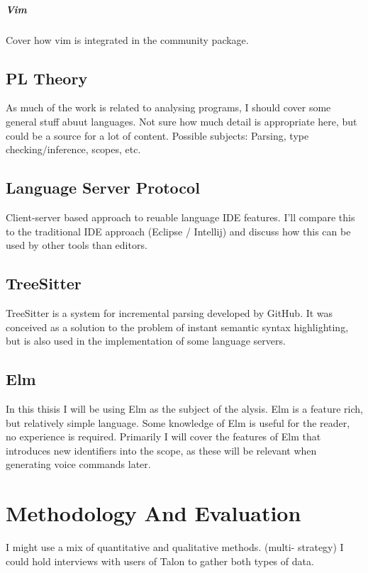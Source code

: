 \documentclass[a4paper,english]{ifimaster}
\begin{document}
\paragraph{Vim}
Cover how vim is integrated in the community package.

\section{PL Theory}
As much of the work is related to analysing programs, I should cover some general stuff abuut languages.
Not sure how much detail is appropriate here, but could be a source for a lot of content.
Possible subjects: Parsing, type checking/inference, scopes, etc.

\section{Language Server Protocol}
Client-server based approach to reuable language IDE features.
I'll compare this to the traditional IDE approach (Eclipse / Intellij)
and discuss how this can be used by other tools than editors.

\section{TreeSitter}
TreeSitter is a system for incremental parsing developed by GitHub.
It was conceived as a solution to the problem of instant semantic syntax highlighting,
but is also used in the implementation of some language servers.

\section{Elm}
In this thisis I will be using Elm as the subject of the alysis.
Elm is a feature rich, but relatively simple language.
Some knowledge of Elm is useful for the reader, no experience is required.
Primarily I will cover the features of Elm that introduces new identifiers into the scope,
as these will be relevant when generating voice commands later.

\chapter{Methodology And Evaluation}
I might use a mix of quantitative and qualitative methods. (multi- strategy) %
I could hold interviews with users of Talon to gather both types of data.
\end{document}
